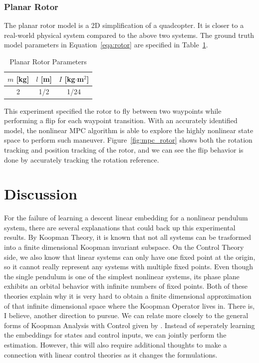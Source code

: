 \documentclass[10pt,twocolumn]{article}
\begin{document}
\subsubsection{Planar Rotor}

The planar rotor model is a 2D simplification of a quadcopter. It is closer to a real-world
physical system compared to the above two systems. The ground truth model parameters
in Equation~\ref{eqa:rotor} are specified in Table~\ref{tbl:rotor_params}.
\begin{table}[h]
  \centering
  \begin{tabular}{ccc}
    \toprule
    $m$ [kg] & $l$ [m] & $I$ [kg$\cdot$m$^2$] \\
    \midrule
    2 & 1/2 & 1/24 \\
    \bottomrule
  \end{tabular}
  \caption{Planar Rotor Parameters}
  \label{tbl:rotor_params}
\end{table}
This experiment specified the rotor to fly between two waypoints while performing a
flip for each waypoint transition. With an accurately identified model, the nonlinear MPC
algorithm is able to explore the highly nonlinear state space to perform such maneuver.
Figure~\ref{fig:mpc_rotor} shows both the rotation tracking and position tracking of the rotor,
and we can see the flip behavior is done by accurately tracking the rotation reference.

\section{Discussion}

For the failure of learning a descent linear embedding for a nonlinear pendulum system, there
are several explanations that could back up this experimental results. By Koopman Theory, it is
known that not all systems can be trasformed into a finite dimensional Koopman invariant subspace.
On the Control Theory side, we also know that linear systems can only have one fixed point at
the origin, so it cannot really represent any systems with multiple fixed points. Even though
the single pendulum is one of the simplest nonlinear systems, its phase plane exhibits an
orbital behavior with infinite numbers of fixed points. Both of these theories explain why it
is very hard to obtain a finite dimensional approximation of that infinite dimensional space
where the Koopman Operator lives in. There is, I believe, another direction to pursue.
We can relate more closely to the general forms of Koopman Analysis with Control given by
\cite{generalkoopman}. Instead of seperately learning the embeddings for states and control
inputs, we can jointly perform the estimation. However, this will also require additional
thoughts to make a connection with linear control theories as it changes the formulations.\\
\end{document}
